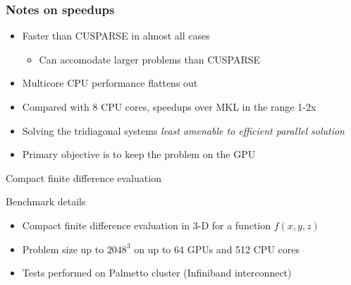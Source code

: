 \begin{frame}
\frametitle{Notes on speedups}
\begin{itemize}
 
\item Faster than CUSPARSE in almost all cases
\begin{itemize}
    \item Can accomodate larger problems than CUSPARSE
\end{itemize}
\item Multicore CPU performance flattens out
\item Compared with 8 CPU cores, speedups over MKL in the range 1-2x
\item Solving the tridiagonal systems
    \emph{least amenable to efficient parallel solution}
\item Primary objective is to keep the problem on the GPU
\end{itemize}
\end{frame}

\begin{frame}{Compact finite difference evaluation}
\begin{block}{Benchmark details}
\begin{itemize}
\item Compact finite difference evaluation in 3-D for a function $f(x, y, z)$
\item Problem size up to $2048^3$ on up to 64 GPUs and 512 CPU cores
\item Tests performed on Palmetto cluster (Infiniband interconnect)
\end{itemize}
\end{block}
\end{frame}

